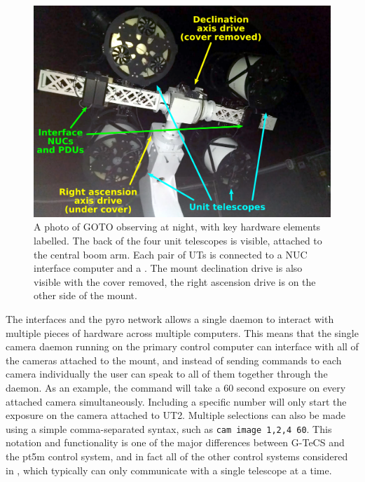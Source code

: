 \begin{colsection}
\begin{colsection}
\begin{figure}[t]
    \begin{center}
        \includegraphics[width=\linewidth]{images/boomarm.pdf}
    \end{center}
    \caption[Photo of GOTO with hardware elements labelled]{
        A photo of GOTO observing at night, with key hardware elements labelled. The back of the four unit telescopes is visible, attached to the central boom arm. Each pair of UTs is connected to a NUC interface computer and a . The mount declination drive is also visible with the cover removed, the right ascension drive is on the other side of the mount.
    }\label{fig:boomarm}
\end{figure}

The interfaces and the \gls{pyro} network allows a single daemon to interact with multiple pieces of hardware across multiple computers. This means that the single camera daemon running on the primary control computer can interface with all of the cameras attached to the mount, and instead of sending commands to each camera individually the user can speak to all of them together through the daemon. As an example, the command  will take a 60 second exposure on every attached camera simultaneously. Including a specific number  will only start the exposure on the camera attached to UT2. Multiple selections can also be made using a simple comma-separated syntax, such as \texttt{cam~image~1,2,4~60}. This notation and functionality is one of the major differences between G-TeCS and the pt5m control system, and in fact all of the other control systems considered in , which typically can only communicate with a single telescope at a time.


\end{colsection}
\end{colsection}
